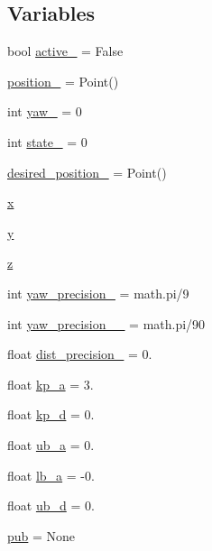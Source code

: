 \subsection*{Variables}
\begin{DoxyCompactItemize}
\item 
bool \hyperlink{namespacego__to__point__service__m_a0a0a9847f2d5f0059f48709cba4df15c}{active\+\_\+} = False
\item 
\hyperlink{namespacego__to__point__service__m_abb95705acc8e0b8a82a6fc5d6243bdd8}{position\+\_\+} = Point()
\item 
int \hyperlink{namespacego__to__point__service__m_ab1e499009bca0d4c9ea5e8954aa37797}{yaw\+\_\+} = 0
\item 
int \hyperlink{namespacego__to__point__service__m_a840bab237e425d4f242bf69afe92f767}{state\+\_\+} = 0
\item 
\hyperlink{namespacego__to__point__service__m_a5e4a4244e883c27be9ed897ea5460cc0}{desired\+\_\+position\+\_\+} = Point()
\item 
\hyperlink{namespacego__to__point__service__m_a3ec6e272b02c0f40a625358965caf70b}{x}
\item 
\hyperlink{namespacego__to__point__service__m_a8a0df04be6cfa44113ee26eefbe11f95}{y}
\item 
\hyperlink{namespacego__to__point__service__m_aa0ed9dc81f0153863a2a971384dbcba3}{z}
\item 
int \hyperlink{namespacego__to__point__service__m_af47f1354626111fc63115c06276ae41d}{yaw\+\_\+precision\+\_\+} = math.\+pi/9
\item 
int \hyperlink{namespacego__to__point__service__m_aa642aefafe9c9c963a86f01c5a256e23}{yaw\+\_\+precision\+\_\+\_\+} = math.\+pi/90
\item 
float \hyperlink{namespacego__to__point__service__m_a15a85217148ccc92490d2ec8366dfbd4}{dist\+\_\+precision\+\_\+} = 0.
\item 
float \hyperlink{namespacego__to__point__service__m_a7e9c758884ac92bbb820e532fd32abf6}{kp\+\_\+a} = 3.
\item 
float \hyperlink{namespacego__to__point__service__m_aa9ffa11cdce18c2942bca64db42cb249}{kp\+\_\+d} = 0.
\item 
float \hyperlink{namespacego__to__point__service__m_ac8de1564925338ead12be0a3763b4119}{ub\+\_\+a} = 0.
\item 
float \hyperlink{namespacego__to__point__service__m_a66ab9d35823a86f4fee11da3fa6a7157}{lb\+\_\+a} = -\/0.
\item 
float \hyperlink{namespacego__to__point__service__m_aba661cc0f865736231acaf5b56101b35}{ub\+\_\+d} = 0.
\item 
\hyperlink{namespacego__to__point__service__m_ab9ea0cd28ffda51b5d6f1a436464f861}{pub} = None
\end{DoxyCompactItemize}


